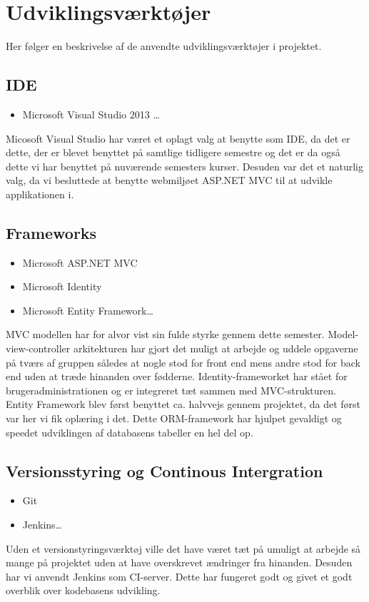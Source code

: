\section{Udviklingsværktøjer} 

Her følger en beskrivelse af de anvendte udviklingsværktøjer i projektet.

\subsection*{IDE}
\begin{itemize}
  \item Microsoft Visual Studio 2013 \ldots
\end{itemize}
Micosoft Visual Studio har været et oplagt valg at benytte som IDE, da det er dette, der er blevet benyttet på samtlige tidligere semestre og det er da også dette vi har benyttet på nuværende semesters kurser. Desuden var det et naturlig valg, da vi besluttede at benytte webmiljøet ASP.NET MVC \citep{aspnetmvcWeb} til at udvikle applikationen i.

\subsection*{Frameworks} 
\begin{itemize}
  \item Microsoft ASP.NET MVC
  \item Microsoft Identity
  \item Microsoft Entity Framework\ldots
\end{itemize}
MVC modellen har for alvor vist sin fulde styrke gennem dette semester. Model-view-controller arkitekturen har gjort det muligt at arbejde og uddele opgaverne på tværs af gruppen således at nogle stod for front end mens andre stod for back end uden at træde hinanden over fødderne. Identity-frameworket har stået for brugeradministrationen og er integreret tæt sammen med MVC-strukturen.
Entity Framework blev først benyttet ca. halvvejs gennem projektet, da det først var her vi fik oplæring i det. Dette ORM-framework har hjulpet gevaldigt og speedet udviklingen af databasens tabeller en hel del op.  

\subsection*{Versionsstyring og Continous Intergration} 
\begin{itemize}
  \item Git
  \item Jenkins\ldots
\end{itemize}
Uden et versionstyringsværktøj ville det have været tæt på umuligt at arbejde så mange på projektet uden at have overskrevet ændringer fra hinanden. Desuden har vi anvendt Jenkins \citep{jenkinsWeb} som CI-server. Dette har fungeret godt og givet et godt overblik over kodebasens udvikling.

